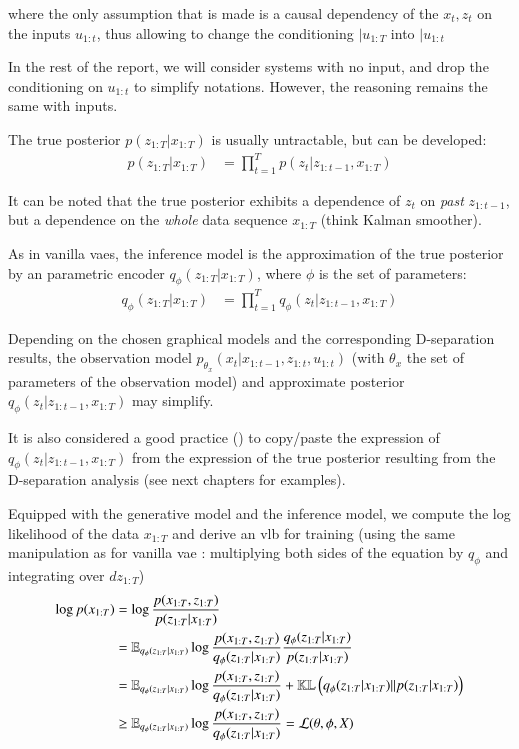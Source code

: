 where the only assumption that is made is a causal dependency of the $x_t, z_t$ on the inputs $u_{1:t}$, thus allowing to change the conditioning $\vert u_{1:T}$ into $\vert u_{1:t}$

In the rest of the report, we will consider systems with no input, and drop the conditioning on $u_{1:t}$ to simplify notations. However, the reasoning remains the same with inputs.

The true posterior  $p(z_{1:T} \vert x_{1:T})$ is usually untractable, but can be developed:
\begin{align*}
    p(z_{1:T} \vert x_{1:T}) &= \prod_{t=1}^T p(z_t \vert z_{1:t-1}, x_{1:T})
\end{align*}

It can be noted that the true posterior exhibits a dependence of $z_t$ on \textit{past} $z_{1:t-1}$, but a dependence on the \textit{whole} data sequence $x_{1:T}$ (think Kalman smoother).

As in vanilla \glspl{vae}, the inference model is the approximation of the true posterior by an parametric encoder $q_{\phi}(z_{1:T} \vert x_{1:T})$, where $\phi$ is the set of parameters:
\begin{align*}
    q_{\phi}(z_{1:T} \vert x_{1:T}) &= \prod_{t=1}^T q_\phi(z_t \vert z_{1:t-1}, x_{1:T})
\end{align*}

Depending on the chosen graphical models and the corresponding D-separation results, the observation model $p_{\theta_x}(x_t \vert x_{1:t-1}, z_{1:t}, u_{1:t})$ (with $\theta_x$ the set of parameters of the observation model) and approximate posterior $q_\phi(z_t \vert z_{1:t-1}, x_{1:T})$ may simplify. 

It is also considered a good practice (\cite{girin_dynamical_2022}) to copy/paste the expression of $q_\phi(z_t \vert z_{1:t-1}, x_{1:T})$ from the expression of the true posterior resulting from the D-separation analysis (see next chapters for examples).

Equipped with the generative model and the inference model, we compute the log likelihood of the data $x_{1:T}$ and derive an \gls{vlb} for training (using the same manipulation as for vanilla \gls{vae} : multiplying both sides of the equation by $q_\phi$ and integrating over $dz_{1:T}$)
\begin{align}
    \log{p(x_{1:T})} &= \log{\frac{p(x_{1:T}, z_{1:T})}{p(z_{1:T} \vert x_{1:T})}} \\
    &= \mathbb{E}_{q_{\phi}(z_{1:T}\vert x_{1:T})} \log{\frac{p(x_{1:T}, z_{1:T})}{q_{\phi}(z_{1:T}\vert x_{1:T})} \frac{q_{\phi}(z_{1:T}\vert x_{1:T})}{p(z_{1:T} \vert x_{1:T})}} \\
    &= \mathbb{E}_{q_{\phi}(z_{1:T}\vert x_{1:T})} \log{\frac{p(x_{1:T}, z_{1:T})}{q_{\phi}(z_{1:T}\vert x_{1:T})} + \mathbb{KL}\left( q_{\phi}(z_{1:T}\vert x_{1:T}) \vert\vert p(z_{1:T} \vert x_{1:T}) \right)} \\
    &\geq \mathbb{E}_{q_{\phi}(z_{1:T}\vert x_{1:T})} \log{\frac{p(x_{1:T}, z_{1:T})}{q_{\phi}(z_{1:T}\vert x_{1:T})}} = \mathcal{L}(\theta, \phi, X)
\end{align}

